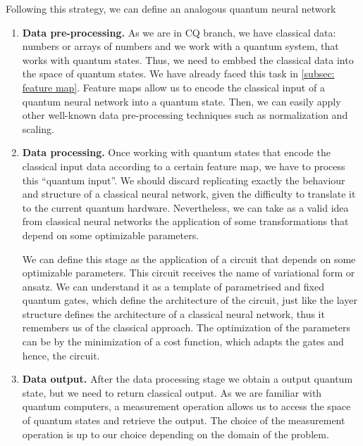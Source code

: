 Following this strategy, we can define an analogous quantum neural network
\begin{enumerate}
    \item \textbf{Data pre-processing. } As we are in CQ branch, we have classical data: numbers or arrays of numbers and we work with a quantum system, that works with quantum states. Thus, we need to embbed the classical data into the space of quantum states. We have already faced this task in \autoref{subsec: feature map}. Feature maps allow us to encode the classical input of a quantum neural network into a quantum state. Then, we can easily apply other well-known data pre-processing techniques such as normalization and scaling. 

    \item \textbf{Data processing. } Once working with quantum states that encode the classical input data according to a certain feature map, we have to process this ``quantum input''. We should discard replicating exactly the behaviour and structure of a classical neural network, given the difficulty to translate it to the current quantum hardware. Nevertheless, we can take as a valid idea from classical neural networks the application of some transformations that depend on some optimizable parameters. 

    We can define this stage as the application of a circuit that depends on some optimizable parameters. This circuit receives the name of variational form or ansatz. We can understand it as a template of parametrised and fixed quantum gates, which define the architecture of the circuit, just like the layer structure defines the architecture of a classical neural network, thus it remembers us of the classical approach. The optimization of the parameters can be by the minimization of a cost function, which adapts the gates and hence, the circuit.

    \item \textbf{Data output. } After the data processing stage we obtain a output quantum state, but we need to return classical output. As we are familiar with quantum computers, a measurement operation allows us to access the space of quantum states and retrieve the output. The choice of the measurement operation is up to our choice depending on the domain of the problem. 
\end{enumerate}

